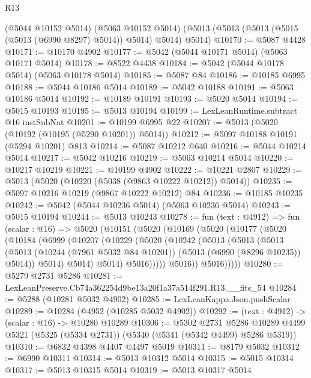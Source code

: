 \begin{lexlean}{R13}
\begin{coremodule}
    (@5044 @10152 @5014)
    (@5063 @10152 @5014)
    (@5013 (@5013 (@5013 (@5015 (@5013 (@6990 @8297) @5014)) @5014) @5014) @5014)
@10170 := @5087 @4428
@10171 := @10170 @4902
@10177 := @5042 (@5044 @10171 @5014) (@5063 @10171 @5014)
@10178 := @8522 @4438
@10184 := @5042 (@5044 @10178 @5014) (@5063 @10178 @5014)
@10185 := @5087 @84
@10186 := @10185 @6995
@10188 := @5044 @10186 @5014
@10189 := @5042 @10188
@10191 := @5063 @10186 @5014
@10192 := @10189 @10191
@10193 := @5020 @5014
@10194 := @5015 @10193
@10195 := @5013 @10194
@10199 := LexLeanRuntime.subtract @16 instSubNat
@10201 := @10199 @6995 @22
@10207 := @5013 (@5020 (@10192 (@10195 (@5290 @10201)) @5014))
@10212 := @5097 @10188 @10191 (@5294 @10201) @813
@10214 := @5087 @10212 @640
@10216 := @5044 @10214 @5014
@10217 := @5042 @10216
@10219 := @5063 @10214 @5014
@10220 := @10217 @10219
@10221 := @10199 @4902
@10222 := @10221 @2807
@10229 := @5013 (@5020 (@10220 (@5038 (@9863 @10222 @10212)) @5014))
@10235 := @5097 @10216 @10219 (@9867 @10222 @10212) @84
@10236 := @10185 @10235
@10242 := @5042 (@5044 @10236 @5014) (@5063 @10236 @5014)
@10243 := @5015 @10194
@10244 := @5013 @10243
@10278 := fun (text : @4912) =>
  fun (scalar : @16) =>
  @5020
    (@10151
      (@5020
        (@10169
          (@5020
            (@10177
              (@5020
                (@10184
                  (@6999
                    (@10207
                      (@10229
                        (@5020
                          (@10242
                            (@5013
                              (@5013
                                (@5013
                                  (@5013
                                    (@10244 (@7961 @5032 @84 @10201))
                                    (@5013 (@6990 (@8296 @10235)) @5014))
                                  @5014)
                                @5014)
                              @5014)
                            @5016)))))
                  @5016))
              @5016)))))
@10280 := @5279 @2731 @5286
@10281 := LexLeanPreserve.Cb74a362254d9be13a20f1a37a514f291.R13.__fits_54
@10284 := @5288 (@10281 @5032 @4902)
@10285 := LexLeanKappa.Json.pushScalar
@10289 := @10284 (@4952 (@10285 @5032 @4902))
@10292 := (text : @4912) -> (scalar : @16) -> @10280 @10289
@10306 := @5302
    @2731
    @5286
    @10289
    @4499
    @5321
    (@5325 (@5334 @2731))
    (@5340 (@5341 (@5342 @4499) @5286 @5319))
@10310 := @6832 @4398 @4407 @4497 @5019
@10311 := @8179 @5032
@10312 := @6990 @10311
@10314 := @5013 @10312 @5014
@10315 := @5015 @10314
@10317 := @5013 @10315 @5014
@10319 := @5013 @10317 @5014

\end{coremodule}
\end{lexlean}
